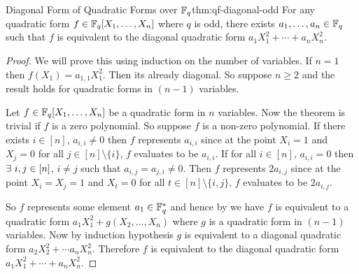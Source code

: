 \begin{Theorem}{Diagonal Form of Quadratic Forms over $\mathbb{F}_q$}{thm:qf-diagonal-odd}
  For any quadratic form $f\in\mathbb{F}_q[X_1,\dots,X_n]$ where $q$ is odd, there exists $a_1,\dots, a_n\in\mathbb{F}_q$ such that $f$ is equivalent to the diagonal quadratic form $a_1 X_1^2+\cdots +a_nX_n^2$.
\end{Theorem}
\begin{proof}
  We will prove this using induction on the number of variables. If $n=1$ then $f(X_1)=a_{1,1}X_1^2$. Then its already diagonal. So suppose $n\geq 2$ and the result holds for quadratic forms in $(n-1)$ variables. 
  
  Let $f\in\mathbb{F}_q[X_1,\dots,X_n]$ be a quadratic form in $n$ variables. Now the theorem is trivial if $f$ is a zero polynomial. So suppose $f$ is a non-zero polynomial. If there exists $i\in[n]$, $a_{i,i}\neq 0$ then $f$ represents $a_{i,i}$ since at the point $X_i=1$ and $X_j=0$ for all $j\in[n]\setminus\{i\}$, $f$ evaluates to be $a_{i,i}$. If for all $i\in[n]$, $a_{i,i}=0$ then $\exists\ i,j\in[n]$, $i\neq j$ such that $a_{i,j}=a_{j,i}\neq 0$. Then $f$ represents $2a_{i,j}$ since at the point $X_i=X_j=1$ and $X_t=0$ for all $t\in[n]\setminus\{i,j\}$, $f$ evaluates to be $2a_{i,j}$. 
  
  So $f$ represents some element $a_1\in\mathbb{F}_q^*$ and hence by \QFRedlem we have $f$ is equivalent to a quadratic form $a_1 X_1^2+g(X_2,\dots, X_n)$ where $g$ is a quadratic form in $(n-1)$ variables. Now by induction hypothesis $g$ is equivalent to a diagonal quadratic form $a_2X_2^2+\cdots a_nX_n^2$. Therefore $f$ is equivalent to the diagonal quadratic form $a_1 X_1^2+\cdots +a_nX_n^2$. 
\end{proof}

